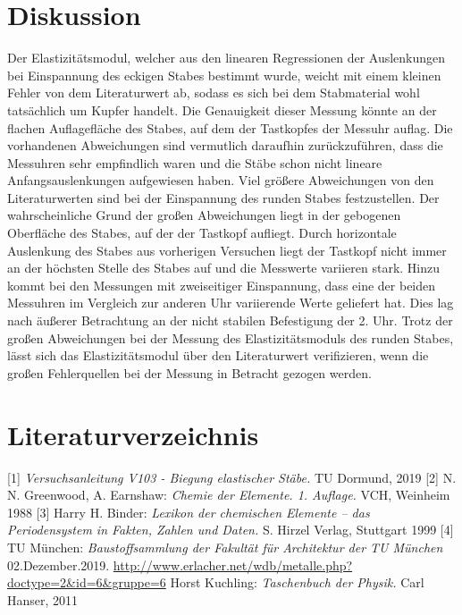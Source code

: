 \documentclass[titlepage = firstcover]{scrartcl}
\begin{document}
    \section{Diskussion}
    Der Elastizitätsmodul, welcher aus den linearen Regressionen der Auslenkungen bei Einspannung des eckigen Stabes bestimmt wurde,
    weicht mit einem kleinen Fehler von dem Literaturwert ab, sodass es sich bei dem Stabmaterial wohl tatsächlich um
    Kupfer handelt. Die Genauigkeit dieser Messung könnte an der flachen Auflagefläche des Stabes, auf dem der Tastkopfes 
    der Messuhr auflag. Die vorhandenen Abweichungen sind vermutlich daraufhin zurückzuführen, dass die Messuhren sehr
    empfindlich waren und die Stäbe schon nicht lineare Anfangsauslenkungen aufgewiesen haben. Viel größere Abweichungen von
    den Literaturwerten sind bei der Einspannung des runden Stabes festzustellen. Der wahrscheinliche Grund der großen Abweichungen
    liegt in der gebogenen Oberfläche des Stabes, auf der der Tastkopf aufliegt. Durch horizontale Auslenkung des Stabes aus 
    vorherigen Versuchen liegt der Tastkopf nicht immer an der höchsten Stelle des Stabes auf und die Messwerte variieren stark.
    Hinzu kommt bei den Messungen mit zweiseitiger Einspannung, dass eine der beiden Messuhren im Vergleich zur anderen Uhr
    variierende Werte geliefert hat. Dies lag nach äußerer Betrachtung an der nicht stabilen Befestigung der 2. Uhr.
    Trotz der großen Abweichungen bei der Messung des Elastizitätsmoduls des runden Stabes, lässt sich das Elastizitätsmodul
    über den Literaturwert verifizieren, wenn die großen Fehlerquellen bei der Messung in Betracht gezogen werden.

    \newpage

    \section{Literaturverzeichnis}
      [1] \textit{Versuchsanleitung V103 - Biegung elastischer Stäbe.} TU Dormund, 2019
      [2] N. N. Greenwood, A. Earnshaw: \textit{Chemie der Elemente. 1. Auflage.} VCH, Weinheim 1988
      [3] Harry H. Binder: \textit{Lexikon der chemischen Elemente – das Periodensystem in Fakten, Zahlen und Daten.} S. Hirzel Verlag, Stuttgart 1999
      [4] TU München: \textit{Baustoffsammlung der Fakultät für Architektur der TU München} 02.Dezember.2019.
          \url{http://www.erlacher.net/wdb/metalle.php?doctype=2&id=6&gruppe=6} \newline
      [5] Horst Kuchling: \textit{Taschenbuch der Physik.} Carl Hanser, 2011
    
\end{document}
